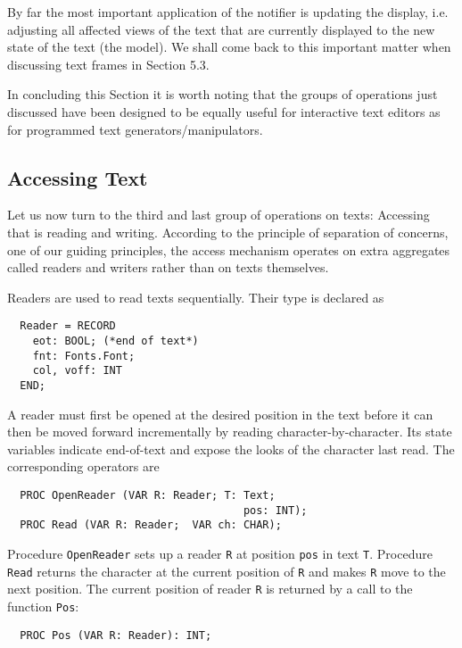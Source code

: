 By far the most important application of the notifier is updating the display, i.e. adjusting all affected
views of the text that are currently displayed to the new state of the text (the model). We shall come
back to this important matter when discussing text frames in Section 5.3.

In concluding this Section it is worth noting that the groups of operations just discussed have been
designed to be equally useful for interactive text editors as for programmed text generators/manipulators.

\subsection{Accessing Text}
Let us now turn to the third and last group of operations on texts: Accessing that is reading and
writing. According to the principle of separation of concerns, one of our guiding principles, the
access mechanism operates on extra aggregates called readers and writers rather than on texts
themselves.

Readers are used to read texts sequentially. Their type is declared as
\begin{verbatim}
  Reader = RECORD
    eot: BOOL; (*end of text*)
    fnt: Fonts.Font;
    col, voff: INT
  END;
\end{verbatim}

A reader must first be opened at the desired position in the text before it can then be moved
forward incrementally by reading character-by-character. Its state variables indicate end-of-text and
expose the looks of the character last read.
The corresponding operators are
\begin{verbatim}
  PROC OpenReader (VAR R: Reader; T: Text;
                                     pos: INT);
  PROC Read (VAR R: Reader;  VAR ch: CHAR);
\end{verbatim}

Procedure \verb|OpenReader| sets up a reader \verb|R| at position \verb|pos| in text \verb|T|. Procedure \verb|Read| returns the
character at the current position of \verb|R| and makes \verb|R| move to the next position.
The current position of reader \verb|R| is returned by a call to the function \verb|Pos|:
\begin{verbatim}
  PROC Pos (VAR R: Reader): INT;
\end{verbatim}

